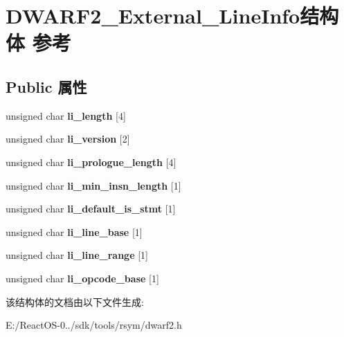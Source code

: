 \hypertarget{struct_d_w_a_r_f2___external___line_info}{}\section{D\+W\+A\+R\+F2\+\_\+\+External\+\_\+\+Line\+Info结构体 参考}
\label{struct_d_w_a_r_f2___external___line_info}
\subsection*{Public 属性}
\begin{DoxyCompactItemize}
\item 
\mbox{\label{struct_d_w_a_r_f2___external___line_info_af6458f2669bbec64b2514114d32ceabe}} 
unsigned char {\bfseries li\+\_\+length} \mbox{[}4\mbox{]}
\item 
\mbox{\label{struct_d_w_a_r_f2___external___line_info_a702b7f7e6421fdb51bb931843fde6ac8}} 
unsigned char {\bfseries li\+\_\+version} \mbox{[}2\mbox{]}
\item 
\mbox{\label{struct_d_w_a_r_f2___external___line_info_a86c48fcebf17f6d5b6cdb8bdbbcab3d2}} 
unsigned char {\bfseries li\+\_\+prologue\+\_\+length} \mbox{[}4\mbox{]}
\item 
\mbox{\label{struct_d_w_a_r_f2___external___line_info_a20c3212358bb5660d5c945445fc737dd}} 
unsigned char {\bfseries li\+\_\+min\+\_\+insn\+\_\+length} \mbox{[}1\mbox{]}
\item 
\mbox{\label{struct_d_w_a_r_f2___external___line_info_a06e7d4e9d66d43b495ae2b533a50ccbe}} 
unsigned char {\bfseries li\+\_\+default\+\_\+is\+\_\+stmt} \mbox{[}1\mbox{]}
\item 
\mbox{\label{struct_d_w_a_r_f2___external___line_info_a3b7e3df1b0456512ce951ab171b95ceb}} 
unsigned char {\bfseries li\+\_\+line\+\_\+base} \mbox{[}1\mbox{]}
\item 
\mbox{\label{struct_d_w_a_r_f2___external___line_info_a6512c25c81f2263be26617d408bcca65}} 
unsigned char {\bfseries li\+\_\+line\+\_\+range} \mbox{[}1\mbox{]}
\item 
\mbox{\label{struct_d_w_a_r_f2___external___line_info_a4d32f9c35c1ad107a6d9031904537430}} 
unsigned char {\bfseries li\+\_\+opcode\+\_\+base} \mbox{[}1\mbox{]}
\end{DoxyCompactItemize}


该结构体的文档由以下文件生成\+:\begin{DoxyCompactItemize}
\item 
E\+:/\+React\+O\+S-\/0../sdk/tools/rsym/dwarf2.\+h\end{DoxyCompactItemize}
